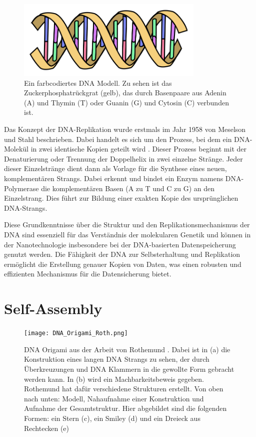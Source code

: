 \begin{figure}
	\centering
	\includegraphics[width=0.8\textwidth]{images/DNA_Doppelhelix_Farbe.png}
	\caption[DNA Modell]{Ein farbcodiertes DNA Modell. Zu sehen ist das Zuckerphosphatrückgrat (gelb), das durch Basenpaare aus Adenin (A) und Thymin (T) oder Guanin (G) und Cytosin (C) verbunden ist.\cite{wikiFigDNA}}
	\label{fig:dna_doppelhelix}
\end{figure}

Das Konzept der DNA-Replikation wurde erstmals im Jahr 1958 von Meselson und Stahl beschrieben. Dabei handelt es sich um den Prozess, bei dem ein DNA-Molekül in zwei identische Kopien geteilt wird \cite{meselson1958replication}. Dieser Prozess beginnt mit der Denaturierung oder Trennung der Doppelhelix in zwei einzelne Stränge. Jeder dieser Einzelstränge dient dann als Vorlage für die Synthese eines neuen, komplementären Strangs. Dabei erkennt und bindet ein Enzym namens DNA-Polymerase die komplementären Basen (A zu T und C zu G) an den Einzelstrang. Dies führt zur Bildung einer exakten Kopie des ursprünglichen DNA-Strangs.

Diese Grundkenntnisse über die Struktur und den Replikationsmechanismus der DNA sind essenziell für das Verständnis der molekularen Genetik und können in der Nanotechnologie insbesondere bei der DNA-basierten Datenspeicherung genutzt werden. Die Fähigkeit der DNA zur Selbsterhaltung und Replikation ermöglicht die Erstellung genauer Kopien von Daten, was einen robusten und effizienten Mechanismus für die Datensicherung bietet.

\section{Self-Assembly}

\begin{figure}
	\centering 
	\texttt{[image: DNA\_Origami\_Roth.png]}
	\caption[DNA Origami]{DNA Origami aus der Arbeit von Rothemund \cite{rothemund2006origami}. 
	Dabei ist in (a) die Konstruktion eines langen DNA Strangs zu sehen, der durch Überkreuzungen und DNA Klammern in die gewollte Form gebracht werden kann. 
	In (b) wird ein Machbarkeitsbeweis gegeben. 
	Rothemund hat dafür verschiedene Strukturen erstellt. Von oben nach unten: Modell, Nahaufnahme einer Konstruktion und Aufnahme der Gesamtstruktur. 
	Hier abgebildet sind die folgenden Formen: ein Stern (c), ein Smiley (d) und ein Dreieck aus Rechtecken (e)}
	\label{fig:dna_origami}
\end{figure}

